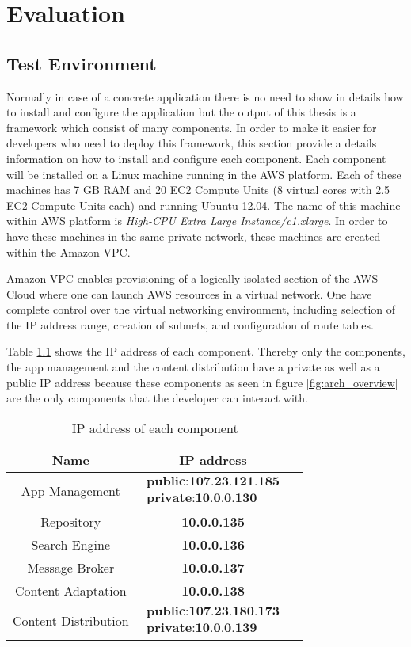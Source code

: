 \chapter{Evaluation\label{cha:chapter6}}


\section{Test Environment\label{sec:eval_te_en}}
Normally in case of a concrete application there is no need to show in details how to install and configure the application but the output of this thesis is a framework which consist of many components. In order to make it easier for developers who need to deploy this framework, this section provide a details information on how to install and configure each component. Each component will be installed on a Linux machine running in the \ac{AWS} platform. Each of these machines has 7 GB RAM and 20 \ac{EC2} Compute Units (8 virtual cores with 2.5 \ac{EC2} Compute Units each) and running Ubuntu 12.04. The name of this machine within \ac{AWS} platform is \textit{High-CPU Extra Large Instance/c1.xlarge}. In order to have these machines in the same private network, these machines are created within the Amazon \ac{VPC}. 

Amazon \ac{VPC} enables provisioning of a logically isolated section of the AWS Cloud where one can launch AWS resources in a virtual network. One have complete control over the virtual networking environment, including selection of the IP address range, creation of subnets, and configuration of route tables.

Table \ref{tbl:ap_addresses} shows the IP address of each component. Thereby only the components, the app management and the content distribution have a private as well as a public IP address because these components as seen in figure \ref{fig:arch_overview} are the only components that the developer can interact with. 

\begin{table}[htb]
\begin{tabular}{|c|c|c|}
\hline 
Name & IP address \\ 
\hline 
App Management & $\begin{array}{l} \textbf{public:107.23.121.185} \\ \textbf{private:10.0.0.130}  \end{array}$ \\ 
\hline 
Repository & \textbf{10.0.0.135} \\ 
\hline 
Search Engine & \textbf{10.0.0.136} \\ 
\hline
Message Broker & \textbf{10.0.0.137} \\ 
\hline
Content Adaptation & \textbf{10.0.0.138} \\ 
\hline
Content Distribution & $\begin{array}{l} \textbf{public:107.23.180.173} \\ \textbf{private:10.0.0.139}  \end{array}$ \\ 
\hline
\end{tabular} 
\caption{IP address of each component}
\label{tbl:ap_addresses}
\end{table} 

